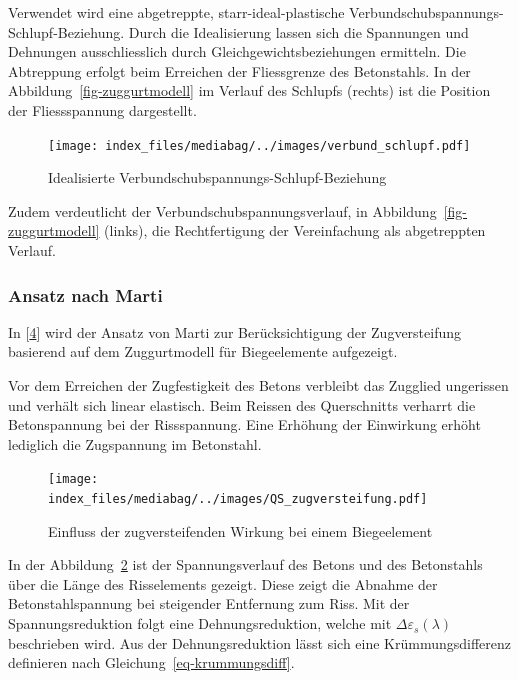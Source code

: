 \documentclass[
  12pt,
  letterpaper,
  egregdoesnotlikesansseriftitles]{scrreprt}
\begin{document}
Verwendet wird eine abgetreppte, starr-ideal-plastische
Verbundschubspannungs-Schlupf-Beziehung. Durch die Idealisierung lassen
sich die Spannungen und Dehnungen ausschliesslich durch
Gleichgewichtsbeziehungen ermitteln. Die Abtreppung erfolgt beim
Erreichen der Fliessgrenze des Betonstahls. In der
Abbildung~\ref{fig-zuggurtmodell} im Verlauf des Schlupfs (rechts) ist
die Position der Fliessspannung dargestellt.

\begin{figure}[H]

{\centering \texttt{[image: index\_files/mediabag/../images/verbund\_schlupf.pdf]}

}

\caption{\label{fig-verbund_schlupf}Idealisierte
Verbundschubspannungs-Schlupf-Beziehung}

\end{figure}

Zudem verdeutlicht der Verbundschubspannungsverlauf, in
Abbildung~\ref{fig-zuggurtmodell} (links), die Rechtfertigung der
Vereinfachung als abgetreppten Verlauf.

\hypertarget{ansatz-nach-marti}{%
\subsubsection{Ansatz nach Marti}\label{ansatz-nach-marti}}

In {[}\protect\hyperlink{ref-Spathelf2022}{4}{]} wird der Ansatz von
Marti zur Berücksichtigung der Zugversteifung basierend auf dem
Zuggurtmodell für Biegeelemente aufgezeigt.

Vor dem Erreichen der Zugfestigkeit des Betons verbleibt das Zugglied
ungerissen und verhält sich linear elastisch. Beim Reissen des
Querschnitts verharrt die Betonspannung bei der Rissspannung. Eine
Erhöhung der Einwirkung erhöht lediglich die Zugspannung im Betonstahl.

\begin{figure}[H]

{\centering \texttt{[image: index\_files/mediabag/../images/QS\_zugversteifung.pdf]}

}

\caption{\label{fig-einfluss_zugversteifung}Einfluss der
zugversteifenden Wirkung bei einem Biegeelement}

\end{figure}

In der Abbildung~\ref{fig-einfluss_zugversteifung} ist der
Spannungsverlauf des Betons und des Betonstahls über die Länge des
Risselements gezeigt. Diese zeigt die Abnahme der Betonstahlspannung bei
steigender Entfernung zum Riss. Mit der Spannungsreduktion folgt eine
Dehnungsreduktion, welche mit \(\Delta \varepsilon_s (\lambda)\)
beschrieben wird. Aus der Dehnungsreduktion lässt sich eine
Krümmungsdifferenz definieren nach Gleichung~\ref{eq-krummungsdiff}.
\end{document}
